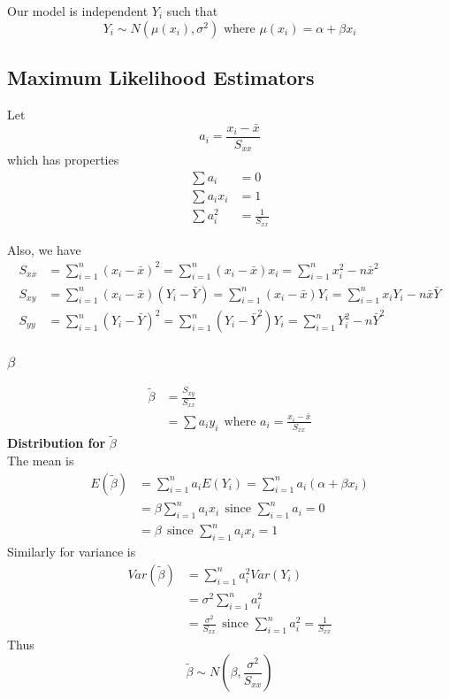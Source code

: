 \documentclass[12pt]{article}
\theoremstyle{definition}
\begin{document}
  Our model is independent $Y_{i}$ such that
  $$Y_{i} \sim N(\mu(x_{i}), \sigma^{2}) \text{ where } \mu(x_{i}) = \alpha + \beta x_{i}$$

  \subsection{Maximum Likelihood Estimators}
  Let
  $$a_{i} = \frac{x_{i} - \bar{x}}{S_{xx}}$$
  which has properties
  \begin{align*}
  \sum a_{i} &= 0 \\
  \sum a_{i}x_{i} &= 1 \\
  \sum a_{i}^{2} &= \frac{1}{S_{xx}}
  \end{align*}

  Also, we have
  \begin{align*}
  S_{xx} &= \sum_{i=1}^{n}(x_{i} - \bar{x})^{2}
  = \sum_{i=1}^{n}(x_{i} - \bar{x})x_{i}
  = \sum_{i=1}^{n}x_{i}^{2} - n\bar{x}^{2} \\
  S_{xy} &= \sum_{i=1}^{n}(x_{i} - \bar{x})(Y_{i} - \bar{Y})
  = \sum_{i=1}^{n}(x_{i} - \bar{x})Y_{i}
  = \sum_{i=1}^{n}x_{i}Y_{i} - n\bar{x}\bar{Y} \\
  S_{yy} &= \sum_{i=1}^{n}(Y_{i} - \bar{Y})^{2}
  = \sum_{i=1}^{n}(Y_{i} - \bar{Y}^{2})Y_{i}
  = \sum_{i=1}^{n}Y_{i}^{2} - n\bar{Y}^{2}
  \end{align*}

  \subsubsection{$\beta$}
  \begin{align*}
  \widetilde{\beta} &= \frac{S_{xy}}{S_{xx}} \\
  &= \sum a_{i}y_{i}  ~~\text{where } a_{i} = \frac{x_{i} - \bar{x}}{S_{xx}}
  \end{align*}
  \textbf{Distribution for } $\widetilde{\beta}$ \\
  The mean is
  \begin{align*}
  E(\widetilde{\beta}) &= \sum_{i=1}^{n} a_{i}E(Y_{i}) = \sum_{i=1}^{n} a_{i}(\alpha + \beta x_{i}) \\
  &= \beta \sum_{i=1}^{n}a_{i}x_{i} ~~\text{since } \sum_{i=1}^{n} a_{i} = 0 \\
  &= \beta ~~\text{since } \sum_{i=1}^{n} a_{i}x_{i} = 1
  \end{align*}
  Similarly for variance is
  \begin{align*}
  Var(\widetilde{\beta}) &= \sum_{i=1}^{n} a_{i}^{2}Var(Y_{i}) \\
  &= \sigma^{2} \sum_{i=1}^{n} a_{i}^{2} \\
  &= \frac{\sigma^{2}}{S_{xx}} ~~\text{since } \sum_{i=1}^{n}a_{i}^{2} = \frac{1}{S_{xx}}
  \end{align*}
  Thus
  $$\widetilde{\beta} \sim N\left(\beta, \frac{\sigma^{2}}{S_{xx}}\right)$$
\end{document}
